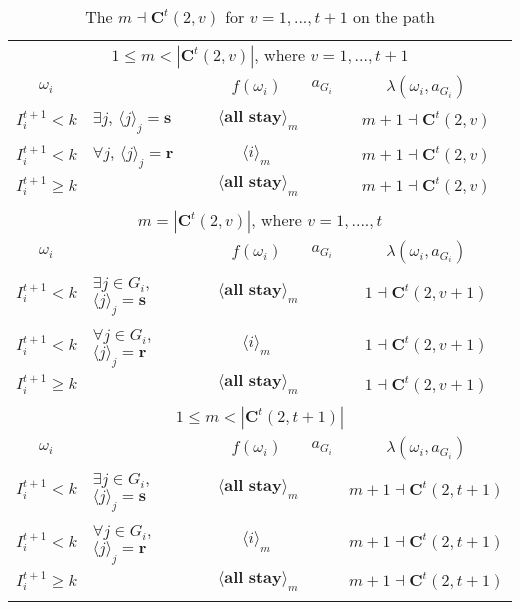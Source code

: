 \documentclass[12pt,letter]{article}
\newcommand{\Kappa}{\mathbf{C}}
\theoremstyle{definition}
\theoremstyle{remark}
\theoremstyle{claim}
\begin{document}
\begin{table}[!htbp]
\caption{The $m\dashv\Kappa^t(2,v)$ for $v=1,...,t+1$ on the path}
\label{table:eqm_path_kt2}
\begin{center}
\begin{tabular}{c l | c | c | c}
\multicolumn{5}{c}{$1\leq m < |\Kappa^t(2,v)|$, where $v=1,...,t+1$}\\
$\omega_i$ 	 & 	   &	$f(\omega_i)$  &	$a_{G_i}$ & $\lambda(\omega_i,a_{G_i})$ \\
\hline
\hline
$I^{t+1}_i< k$  	& 	$\exists j$, $\langle j \rangle_j=\textbf{s}$	& $\langle \textbf{all stay} \rangle_m$		&  	& $m+1\dashv \Kappa^t(2,v)$\\
$I^{t+1}_i< k$  	& 	$\forall j$, $\langle j \rangle_j=\textbf{r}$	& $\langle i \rangle_m$		&  	& $m+1\dashv \Kappa^t(2,v)$\\
$I^{t+1}_i\geq k$	 & 				& $\langle \textbf{all stay} \rangle_m$ 	& 		& $m+1\dashv \Kappa^t(2,v)$\\
\hline
\\
\multicolumn{5}{c}{$m= |\Kappa^t(2,v)|$, where $v=1,....,t$}\\
$\omega_i$ 	 & 	   &	$f(\omega_i)$  &	$a_{G_i}$ & $\lambda(\omega_i,a_{G_i})$ \\
\hline
\hline
$I^{t+1}_i< k$  	& 	$\exists j\in G_i$, $\langle j \rangle_j=\textbf{s}$	& $\langle \textbf{all stay} \rangle_m$		&  	& $1\dashv \Kappa^t(2,v+1)$\\
$I^{t+1}_i< k$  	& 	$\forall j\in G_i$, $\langle j \rangle_j=\textbf{r}$	& $\langle i \rangle_m$		&  	& $1\dashv \Kappa^t(2,v+1)$\\
$I^{t+1}_i\geq k$	 & 				& $\langle \textbf{all stay} \rangle_m$ 	& 		& $1\dashv \Kappa^t(2,v+1)$\\
\hline
\\
\multicolumn{5}{c}{$1\leq m < |\Kappa^t(2,t+1)|$}\\
$\omega_i$ 	 & 	   &	$f(\omega_i)$  &	$a_{G_i}$ & $\lambda(\omega_i,a_{G_i})$ \\
\hline
\hline
$I^{t+1}_i< k$  	& 	$\exists j\in G_i$, $\langle j \rangle_j=\textbf{s}$	& $\langle \textbf{all stay} \rangle_m$		&  	& $m+1\dashv \Kappa^t(2,t+1)$\\
$I^{t+1}_i< k$  	& 	$\forall j\in G_i$, $\langle j \rangle_j=\textbf{r}$	& $\langle i \rangle_m$		&  	& $m+1\dashv \Kappa^t(2,t+1)$\\
$I^{t+1}_i\geq k$	 & 				& $\langle \textbf{all stay} \rangle_m$ 	& 		& $m+1\dashv \Kappa^t(2,t+1)$\\
\hline
\\

\end{tabular}
\end{center}
\end{table}
\end{document}
